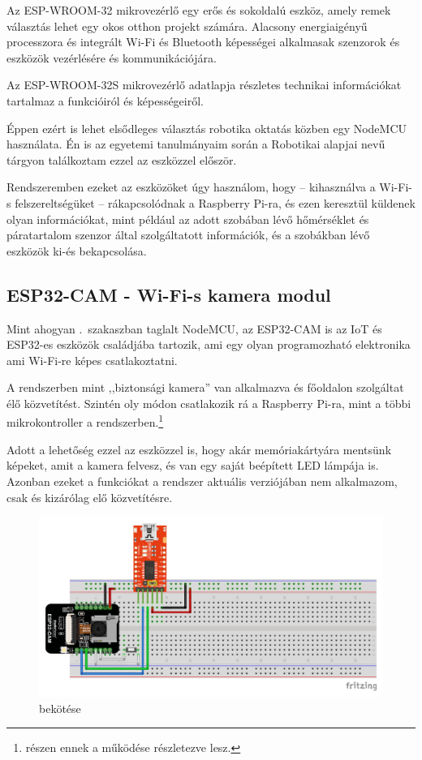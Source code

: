 \documentclass[
]{thesis-ekf}
\theoremstyle{definition}
\theoremstyle{remark}
\begin{document}
	Az ESP-WROOM-32 mikrovezérlő egy erős és sokoldalú eszköz, amely remek választás lehet egy okos otthon projekt számára. Alacsony energiaigényű processzora és integrált Wi-Fi és Bluetooth képességei alkalmasak szenzorok és eszközök vezérlésére és kommunikációjára.
	
	Az ESP-WROOM-32S mikrovezérlő adatlapja részletes technikai információkat tartalmaz a funkcióiról és képességeiről.\cite{esp-32-datasheet}\cite{esp32-devices}
	
	Éppen ezért is lehet elsődleges választás robotika oktatás közben egy NodeMCU használata. Én is az egyetemi tanulmányaim során a Robotikai alapjai nevű tárgyon találkoztam ezzel az eszközzel először.
	
	Rendszeremben ezeket az eszközöket úgy használom, hogy -- kihasználva a Wi-Fi-s felszereltségüket -- rákapcsolódnak a Raspberry Pi-ra, és ezen keresztül küldenek olyan információkat, mint például az adott szobában lévő hőmérséklet és páratartalom szenzor által szolgáltatott információk, és a szobákban lévő eszközök ki-és bekapcsolása.
	
	\subsection{ESP32-CAM - Wi-Fi-s kamera modul}
	
	Mint ahogyan .~szakaszban taglalt NodeMCU, az ESP32-CAM is az IoT és ESP32-es eszközök családjába tartozik, ami egy olyan programozható elektronika ami Wi-Fi-re képes csatlakoztatni.
	
	A rendszerben mint ,,biztonsági kamera'' van alkalmazva és főoldalon szolgáltat élő közvetítést. Szintén oly módon csatlakozik rá a Raspberry Pi-ra, mint a többi mikrokontroller a rendszerben.\footnote{\label{later-expl-fn} részen ennek a működése részletezve lesz.}
	
	Adott a lehetőség ezzel az eszközzel is, hogy akár memóriakártyára mentsünk képeket, amit a kamera felvesz, és van egy saját beépített LED lámpája is. Azonban ezeket a funkciókat a rendszer aktuális verziójában nem alkalmazom, csak és kizárólag elő közvetítésre.%
	
	\begin{figure}[ht!]
		\centering
		\includegraphics[width=1\textwidth]{./src/schematics/ESP32 CAM schematics}
		\caption{ bekötése}
		\label{esp32-cam-schematics}
	\end{figure}	
\end{document}
